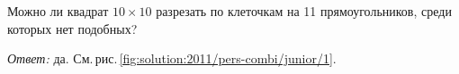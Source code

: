 Можно ли квадрат $10 \times 10$ разрезать по клеточкам на 11 прямоугольников,
среди которых нет подобных?

%
\label{solution:2011/pers-combi/junior/1}%
\emph{Ответ:} да.
См.\,рис.\,\ref{fig:solution:2011/pers-combi/junior/1}.

